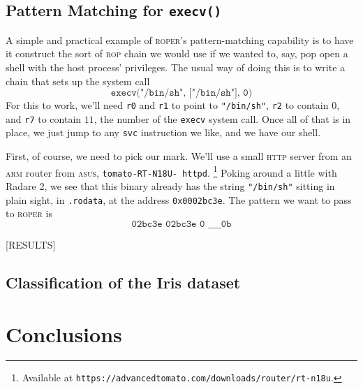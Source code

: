 \subsection{Pattern Matching for \texttt{execv()}}

A simple and practical example of \textsc{roper}'s
pattern-matching capability is to have it construct the sort of
\textsc{rop} chain we would use if we wanted to, say, pop open a
shell with the host process' privileges. The usual way of
doing this is to write a chain that sets up the system call
$$\texttt{execv("/bin/sh", ["/bin/sh"], 0)}$$
For this to work, we'll need \texttt{r0} and \texttt{r1} to point to
\texttt{"/bin/sh"}, \texttt{r2} to contain $0$, and
\texttt{r7} to contain $11$, the number of the \texttt{execv}
system call. Once all of that is in place, we just jump to any
\texttt{svc} instruction we like, and we have our shell.

First, of course, we need to pick our mark. We'll use a small
\textsc{http} server from an  \textsc{arm} router from \textsc{asus},
\texttt{tomato-RT-N18U- httpd}.%
\footnote{Available at
\texttt{https://advancedtomato.com/downloads/router/rt-n18u}.}
Poking around a little with
Radare 2, we see that this binary already has the string
\texttt{"/bin/sh"} sitting in plain sight, in \texttt{.rodata},
at the address \texttt{0x0002bc3e}. The pattern we want to pass to
\textsc{roper} is
$$\texttt{02bc3e 02bc3e 0 \_ \_ \_ \_ 0b}$$

[RESULTS]

\subsection{Classification of the Iris dataset}




\section{Conclusions}



\begin{acks}


\end{acks}
